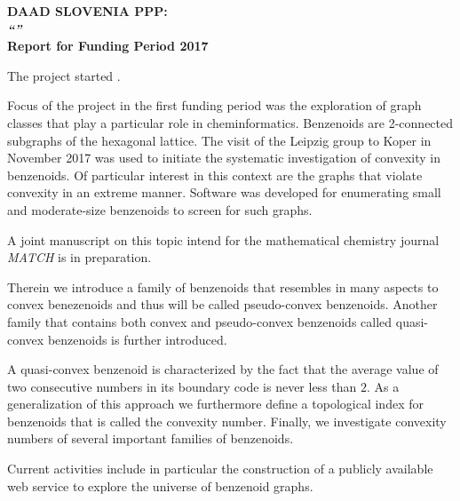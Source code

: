 \documentclass{article}
\begin{document}
 

\par\noindent\textbf{\large DAAD SLOVENIA PPP:\\[1em]
  \emph{``''}\\[1.0em]
  Report for Funding Period 2017}

The project started . 

Focus of the project in the first funding period was the exploration of
graph classes that play a particular role in cheminformatics. Benzenoids
are 2-connected subgraphs of the hexagonal lattice. The visit of the
Leipzig group to Koper in November 2017 was used to initiate the systematic
investigation of convexity in benzenoids. Of particular interest in this
context are the graphs that violate convexity in an extreme manner. Software
was developed for enumerating small and moderate-size benzenoids to screen
for such graphs. 


A joint manuscript on this topic intend for the mathematical chemistry
journal \emph{MATCH} is in preparation.

Therein we introduce a family of benzenoids that
resembles in many aspects to convex benezenoids and thus will be called pseudo-convex
benzenoids. Another family that contains both convex and pseudo-convex benzenoids called 
quasi-convex benzenoids is further introduced. 

A quasi-convex benzenoid is characterized by the fact that the average value of two consecutive 
numbers in its boundary code is never less than $2$. As a generalization of this approach we 
furthermore define a topological index for benzenoids that is called the convexity number. Finally, 
we investigate convexity numbers of several important families of benzenoids.

Current activities include in particular the construction of a publicly
available web service to explore the universe of benzenoid graphs. 
\end{document}
